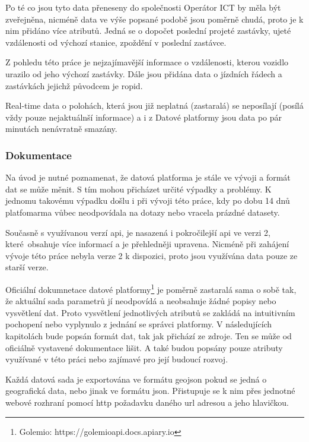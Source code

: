 \bigbreak

Po té co jsou tyto data přeneseny do společnosti Operátor ICT by měla být zveřejněna, nicméně data ve výše popsané podobě jsou poměrně chudá, proto je k nim přidáno více atributů. Jedná se o dopočet poslední projeté zastávky, ujeté vzdálenosti od výchozí stanice, zpoždění v poslední zastávce.

\bigbreak

 Z pohledu této práce je nejzajímavější informace o vzdálenosti, kterou vozidlo urazilo od jeho výchozí zastávky. Dále jsou přidána data o jízdních řádech a zastávkách jejichž původcem je \gls{ropid}.

\bigbreak

Real-time data o polohách, která jsou již neplatná (zastaralá) se neposílají (posílá vždy pouze nejaktuálnší informace) a i z Datové platformy jsou data po pár minutách nenávratně smazány.

\subsubsection{Dokumentace}

Na úvod je nutné poznamenat, že datová platforma je stále ve vývoji a formát dat se může měnit. S tím mohou přicházet určité výpadky a problémy. K jednomu takovému výpadku došlu i při vývoji této práce, kdy po dobu 14 dnů platfomarma vůbec neodpovídala na dotazy nebo vracela prázdné datasety.

\bigbreak

Současně s využívanou verzí \gls{api}, je nasazená i pokročilejší \gls{api} ve verzi 2, které obsahuje více informací a je přehledněji upravena. Nicméně při zahájení vývoje této práce nebyla verze 2 k dispozici, proto jsou využívána data pouze ze starší verze.

\bigbreak

Oficiální dokumnetace datové platformy\footnote{Golemio: https://golemioapi.docs.apiary.io} je poměrně zastaralá sama o sobě tak, že aktuální sada parametrů jí neodpovídá a neobsahuje žádné popisy nebo vysvětlení dat. Proto vysvětlení jednotlivých atributů se zakládá na intuitivním pochopení nebo vyplynulo z jednání se správci platformy. V následujících kapitolách bude popsán formát dat, tak jak přichází ze zdroje. Ten se může od oficiálně vystavené dokumentace lišit. A také budou popsány pouze atributy využívané v této práci nebo zajímavé pro její budoucí rozvoj.

\bigbreak

Každá datová sada je exportována ve formátu \gls{geojson} pokud se jedná o geografická data, nebo jinak ve formátu \gls{json}. Přistupuje se k nim přes jednotné webové rozhraní pomocí \gls{http} požadavku daného \gls{url} adresou a jeho hlavičkou.


